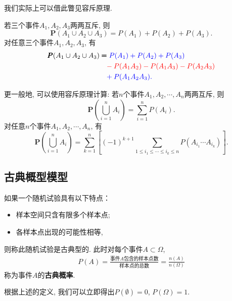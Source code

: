 \begin{asidebox}
    我们实际上可以借此瞥见容斥原理.
    \begin{remark}
        若三个事件$A_1, A_2, A_3$两两互斥, 则
        $$\pmb P(A_1 \cup A_2 \cup A_3) = P(A_1)+P(A_2)+P(A_3).$$
        对任意三个事件$A_1, A_2, A_3$, 有
        \begin{align*}
            \pmb P(A_1 \cup A_2 \cup A_3) & \pmb=\color{blue}P(A_1)+P(A_2)+P(A_3)              \\
                                          & \phantom=\color{red}-P(A_1A_2)-P(A_1A_3)-P(A_2A_3) \\
                                          & \phantom=\color{blue}+P(A_1A_2A_3).
        \end{align*}%
    \end{remark}

    \begin{remark}
        更一般地, 可以使用容斥原理计算:
        若$n$个事件$A_1, A_2, \cdots, A_n$两两互斥, 则
        $$\pmb P\left( \bigcup_{i=1}^n A_i \right)=\sum_{i=1}^n P(A_i).$$
        \vspace{0.2in}
        对任意$n$个事件$A_1, A_2, \cdots, A_n$, 有
        $$\pmb P\left( \bigcup_{i=1}^n A_i \right)=\sum_{k=1}^n \left[ (-1)^{k+1} \sum_{1\le i_1\le \cdots\le i_k \le n} P(A_{i_1}\cdots A_{i_k}) \right].$$
    \end{remark}


\end{asidebox}

\subsection{古典概型模型}
\begin{definition}
    如果一个随机试验具有以下特点：
    \begin{itemize}%
        \item 样本空间只含有限多个样本点; 
        \item 各样本点出现的可能性相等, 
    \end{itemize}
    则称此随机试验是古典型的. 此时对每个事件$A\subset \Omega$, 
    \begin{align*}
        P(A)=\frac{\mbox{事件$A$包含的样本点数}}{\mbox{样本点的总数}}=\frac{n(A)}{n(\Omega)}
    \end{align*}
    称为事件$A$的\textbf{古典概率}. 
\end{definition}

根据上述的定义, 我们可以立即得出$P(\emptyset)=0$, $P(\Omega)=1$. 






